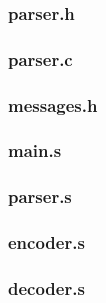 \subsubsection{parser.h}\label{app_parserH}

\clearpage

\subsubsection{parser.c}\label{app_parser}

\clearpage

\subsubsection{messages.h}\label{app_messages}

\clearpage

\subsubsection{main.s}\label{app_main_asm}

\clearpage

\subsubsection{parser.s}\label{app_parser_asm}

\clearpage

\subsubsection{encoder.s}\label{app_encoder_asm}

\clearpage

\subsubsection{decoder.s}\label{app_decoder_asm}

\clearpage


